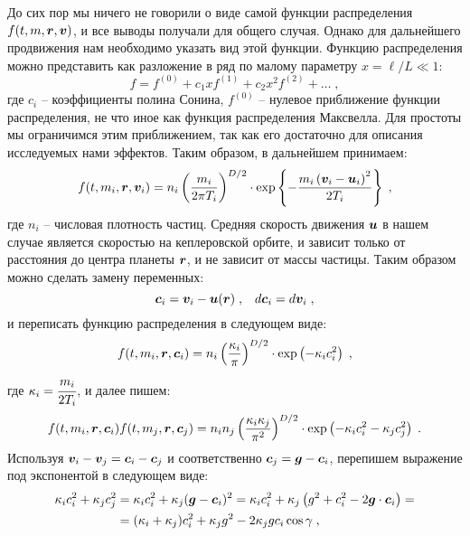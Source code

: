До сих пор мы ничего не говорили о виде самой функции распределения $f(t,m,\bm{r},\bm{v})$, и все выводы получали для общего 
случая. Однако для дальнейшего продвижения нам необходимо указать вид этой функции. Функцию распределения можно представить
как разложение в ряд по малому параметру $x=\ell/L\ll 1$:
\begin{equation}
  f = f^{(0)} + c_1xf^{(1)}+c_2x^2f^{(2)}+\dots\;,
\end{equation}
где $c_i$ -- коэффициенты полина Сонина, $f^{(0)}$ -- нулевое приближение функции распределения, не что иное как функция
распределения Максвелла. Для простоты мы ограничимся этим приближением, так как его достаточно для описания исследуемых нами эффектов.
Таким образом, в дальнейшем принимаем:
\begin{equation}\label{eq:Maxwell_distribution}
  f(t,m_i,\bm{r},\bm{v}_i) = n_i \left(\frac{m_i}{2\pi T_i}\right)^{D/2}\cdot\exp\left\{-\frac{m_i\left(\bm{v}_i-\bm{u}_i\right)^2}{2T_i}\right\}\;,
\end{equation}
где $n_i$ -- числовая плотность частиц. Средняя скорость движения $\bm{u}$ в нашем случае является скоростью на кеплеровской орбите, 
и зависит только от 
расстояния до центра планеты $\bm{r}$, и не зависит от массы частицы. Таким образом можно сделать замену переменных:
\begin{equation}
  \bm{c}_i = \bm{v}_i - \bm{u}(\bm{r})\;,\;\;\;d\bm{c}_i=d\bm{v}_i\;,
\end{equation}
и переписать функцию распределения в следующем виде:
\begin{equation}
  f(t,m_i,\bm{r},\bm{c}_i) = n_i\left(\frac{\kappa_i}{\pi}\right)^{D/2}\cdot\exp\left(-\kappa_ic^2_i\right)\;,
\end{equation}
где $\kappa_i=\cfrac{m_i}{2T_i}$, и далее пишем:
\begin{equation}
  f(t,m_i,\bm{r},\bm{c}_i)f(t,m_j,\bm{r},\bm{c}_j)=n_in_j\left(\frac{\kappa_i\kappa_j}{\pi^2}\right)^{D/2}
  \cdot\exp\left(-\kappa_ic^2_i-\kappa_jc^2_j\right)\;.
\end{equation}
 Используя $\bm{v}_i-\bm{v}_j=\bm{c}_i-\bm{c}_j$ и соответственно $\bm{c}_j=\bm{g}-\bm{c}_i$, перепишем выражение под экспонентой в следующем виде:
 \begin{equation}
   \begin{split}
     \kappa_ic^2_i+\kappa_jc^2_j &= \kappa_ic^2_i+\kappa_j(\bm{g}-\bm{c}_i)^2=\kappa_ic^2_i+\kappa_j\left(g^2+c^2_i-2\bm{g}\cdot\bm{c}_i\right)=\\
     &=(\kappa_i+\kappa_j)c^2_i+\kappa_jg^2-2\kappa_jgc_i\cos\gamma\;,
   \end{split}
 \end{equation}
